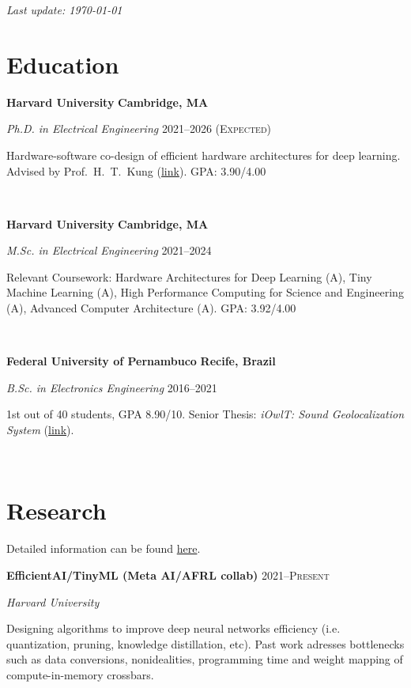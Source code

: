 \documentclass[letterpaper,10pt]{article}
\newcommand{\entry}[4]{

\begin{minipage}[t]{.15\textwidth}
\end{minipage}
\hfill\vline\hfill 
\begin{minipage}[t]{0.95\textwidth}
#2 \hfill \textsc{#1}

\textit{#3}

\footnotesize{#4}
\end{minipage}\\\vspace{.25cm}}
\newcommand{\we}[5]{

\begin{minipage}[t]{.15\textwidth}
\end{minipage}
\hfill\vline\hfill 
\begin{minipage}[t]{0.95\textwidth}
#2 \hfill \textbf{#5}

\textit{#3} \hfill \textsc{#1}

\footnotesize{#4}
\end{minipage}\\\vspace{.25cm}}
\newcommand{\harv}{Harvard University}
\newcommand{\ufpe}{Federal University of Pernambuco}
\begin{document}
\par{\par}
\par{\par}
\par{\par}
\hfill \textit{Last update: \today}
\vspace{-.25cm}

\section{Education}
\vspace*{.1cm}
\we{2021--2026 (Expected)}{\textbf{\harv}}{Ph.D. in Electrical Engineering}{Hardware-software co-design of efficient hardware architectures for deep learning. Advised by Prof.\ H.\ T.\ Kung (\href{https://www.eecs.harvard.edu/htk/}{link}). GPA: 3.90/4.00}{Cambridge, MA}

\we{2021--2024}{\textbf{\harv}}{M.Sc. in Electrical Engineering}{Relevant Coursework: Hardware Architectures for Deep Learning (A), Tiny Machine Learning (A), High Performance Computing for Science and Engineering (A), Advanced Computer Architecture (A). GPA: 3.92/4.00}{Cambridge, MA}

\we{2016--2021}{\textbf{\ufpe}}{B.Sc. in Electronics Engineering}{
	1st out of 40 students, GPA 8.90/10. Senior Thesis: \textit{iOwlT: Sound Geolocalization System} (\href{https://www.matheussfarias.com/assets/files/SeniorThesis.pdf}{link}).
	}{Recife, Brazil}

\vspace*{-.25cm}
\section{Research}

Detailed information can be found \href{https://www.matheussfarias.com/}{here}.

\vspace{.1cm}

\entry{2021--Present}{\textbf{EfficientAI/TinyML (Meta AI/AFRL collab)}}{\harv}{
	Designing algorithms to improve deep neural networks efficiency (i.e. quantization, pruning, knowledge distillation, etc). Past work adresses bottlenecks such as data conversions, nonidealities, programming time and weight mapping of compute-in-memory crossbars.
}
\end{document}

